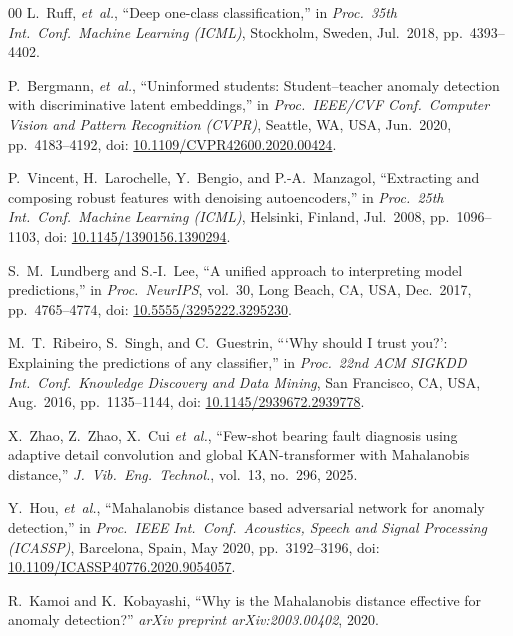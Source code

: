 \documentclass[conference]{IEEEtran}
\begin{document}
\begin{thebibliography}{00}
L.~Ruff, \textit{et~al.},
``Deep one-class classification,''
in \textit{Proc.\ 35th Int.\ Conf.\ Machine Learning (ICML)},
Stockholm, Sweden, Jul.\ 2018, pp.\ 4393--4402.

P.~Bergmann, \textit{et~al.},
``Uninformed students: Student--teacher anomaly detection
with discriminative latent embeddings,''
in \textit{Proc.\ IEEE/CVF Conf.\ Computer Vision and Pattern Recognition (CVPR)},
Seattle, WA, USA, Jun.\ 2020, pp.\ 4183--4192,
doi: \href{https://doi.org/10.1109/CVPR42600.2020.00424}{10.1109/CVPR42600.2020.00424}.

P.~Vincent, H.~Larochelle, Y.~Bengio, and P.-A.~Manzagol,
``Extracting and composing robust features with denoising autoencoders,''
in \textit{Proc.\ 25th Int.\ Conf.\ Machine Learning (ICML)},
Helsinki, Finland, Jul.\ 2008, pp.\ 1096--1103,
doi: \href{https://doi.org/10.1145/1390156.1390294}{10.1145/1390156.1390294}.

S.~M.~Lundberg and S.-I.~Lee,
``A unified approach to interpreting model predictions,''
in \textit{Proc.\ NeurIPS},
vol.~30, Long Beach, CA, USA, Dec.\ 2017, pp.\ 4765--4774,
doi: \href{https://doi.org/10.5555/3295222.3295230}{10.5555/3295222.3295230}.

M.~T.~Ribeiro, S.~Singh, and C.~Guestrin,
``{`Why should I trust you?'}: Explaining the predictions of any classifier,''
in \textit{Proc.\ 22nd ACM SIGKDD Int.\ Conf.\ Knowledge Discovery
and Data Mining}, San Francisco, CA, USA, Aug.\ 2016, pp.\ 1135--1144,
doi: \href{https://doi.org/10.1145/2939672.2939778}{10.1145/2939672.2939778}.

X.~Zhao, Z.~Zhao, X.~Cui \textit{et~al.},
``Few-shot bearing fault diagnosis using adaptive detail convolution and
global KAN-transformer with Mahalanobis distance,''
\textit{J.\ Vib.\ Eng.\ Technol.}, vol.~13, no.~296, 2025.

Y.~Hou, \textit{et~al.},
``Mahalanobis distance based adversarial network for anomaly detection,''
in \textit{Proc.\ IEEE Int.\ Conf.\ Acoustics, Speech and Signal Processing
(ICASSP)}, Barcelona, Spain, May 2020, pp.\ 3192--3196,
doi: \href{https://doi.org/10.1109/ICASSP40776.2020.9054057}{10.1109/ICASSP40776.2020.9054057}.

R.~Kamoi and K.~Kobayashi,
``Why is the Mahalanobis distance effective for anomaly detection?''
\textit{arXiv preprint arXiv:2003.00402}, 2020.


\end{thebibliography}
\end{document}
